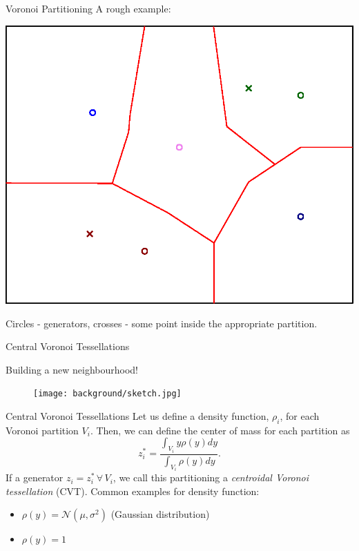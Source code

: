 \documentclass[t]{beamer}
\begin{document}
\begin{frame}[label=vorpart3]{Voronoi Partitioning}
A rough example:
\begin{center}
\includegraphics[scale=0.6]{background/Voronoi-example.eps}
\end{center}
Circles - generators, crosses - some point inside the appropriate partition.
\end{frame}
\begin{frame}[label=centvorpart1]{Central Voronoi Tessellations}
\begin{center}
Building a new neighbourhood!
\begin{figure}
\centering
\texttt{[image: background/sketch.jpg]}
\end{figure}
\end{center}
\end{frame}
\begin{frame}[label=centvorpart2]{Central Voronoi Tessellations}
Let us define a density function, $\rho_i$, for each Voronoi partition $V_{i}$. Then, we can define the center of mass for each partition as
\begin{equation*}
z_{i}^{*} = \frac{\int_{V_{i}}y\rho(y)dy}{\int_{V_{i}}\rho(y)dy}.
\end{equation*}
If a generator $z_{i} = z_{i}^{*} \, \forall \,V_{i}$, we call this partitioning a \emph{centroidal Voronoi tessellation} (CVT).
Common examples for density function:
\begin{itemize}
\item $\rho(y) = \mathcal{N}\left( \mu, \sigma ^2 \right)$ (Gaussian distribution)
\item $\rho(y) = 1$
\end{itemize}
\end{frame}
\end{document}
